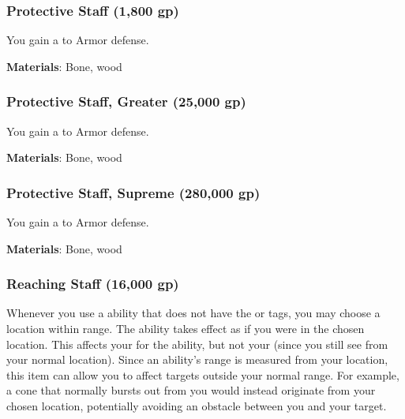 \lowercase{\hypertarget{item:Protective Staff}{}}\label{item:Protective Staff}
\hypertarget{item:Protective Staff}{\subsubsection{Protective Staff\hfill{} (1,800 gp)}}

You gain a   to Armor defense.



\vspace{0.25em}
\textbf{Materials}: Bone, wood


\lowercase{\hypertarget{item:Protective Staff, Greater}{}}\label{item:Protective Staff, Greater}
\hypertarget{item:Protective Staff, Greater}{\subsubsection{Protective Staff, Greater\hfill{} (25,000 gp)}}

You gain a   to Armor defense.



\vspace{0.25em}
\textbf{Materials}: Bone, wood


\lowercase{\hypertarget{item:Protective Staff, Supreme}{}}\label{item:Protective Staff, Supreme}
\hypertarget{item:Protective Staff, Supreme}{\subsubsection{Protective Staff, Supreme\hfill{} (280,000 gp)}}

You gain a   to Armor defense.



\vspace{0.25em}
\textbf{Materials}: Bone, wood


\lowercase{\hypertarget{item:Reaching Staff}{}}\label{item:Reaching Staff}
\hypertarget{item:Reaching Staff}{\subsubsection{Reaching Staff\hfill{} (16,000 gp)}}

Whenever you use a  ability that does not have the  or  tags, you may choose a location within \rngclose range.
The ability takes effect as if you were in the chosen location.
This affects your  for the ability, but not your  (since you still see from your normal location).
Since an ability's range is measured from your location, this item can allow you to affect targets outside your normal range.
For example, a cone that normally bursts out from you would instead originate from your chosen location, potentially avoiding an obstacle between you and your target.




